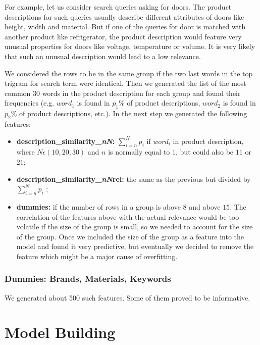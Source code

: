 \documentclass[12pt]{article}
\begin{document}
For example, let us consider search queries asking for doors. The product descriptions for such queries usually describe different attributes of doors like height, width and material. But if one of the queries for door is matched with another product like refrigerator, the product description would feature very unusual properties for doors like voltage, temperature or volume. It is very likely that such an unusual description would lead to a low relevance.

We considered the rows to be in the same group if the two last words in the top trigram for search term were identical. Then we generated the list of the most common 30 words in the product description for each group and found their frequencies (e.g. $word_1$ is found in $p_1\%$ of product descriptions, $word_2$ is found in $p_2\%$ of product descriptions, etc.).
In the next step we generated the following features:
\begin{itemize}
\item \textbf{description\_similarity\_\emph{nN}:} $\sum_{i=n}^{N} p_i$ if $word_i$ in product description, where $N\epsilon (10,20,30)$ and $n$ is normally equal to $1$, but could also be $11$ or $21$;
\item \textbf{description\_similarity\_\emph{nN}rel:} the same as the previous but divided by $\sum_{i=n}^{N} p_i$ ;
\item \textbf{dummies:} if the number of rows in a group is above $8$ and above $15$. The correlation of the features above with the actual relevance would be too volatile if the size of the group is small, so we needed to account for the size of the group. Once we included the size of the group as a feature into the model and found it very predictive, but eventually we decided to remove the feature which might be a major cause of overfitting.
\end{itemize}

\subsubsection{Dummies: Brands, Materials, Keywords}
\label{subsubsec:dummies_IandK}
We generated about 500 such features. Some of them proved to be informative.









\section{Model Building}
\end{document}
